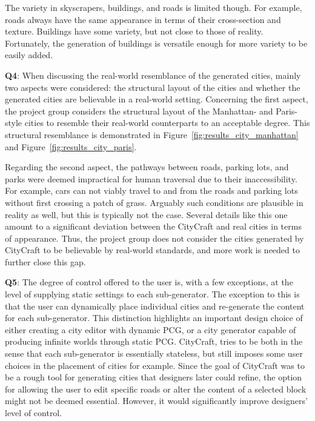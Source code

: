 The variety in skyscrapers, buildings, and roads is limited though.
For example, roads always have the same appearance in terms of their cross-section and texture.
Buildings have some variety, but not close to those of reality.
Fortunately, the generation of buildings is versatile enough for more variety to be easily added.

\textbf{Q4}:
When discussing the real-world resemblance of the generated cities, mainly two aspects were considered: the structural layout of the cities and whether the generated cities are believable in a real-world setting. 
Concerning the first aspect, the project group considers the structural layout of the Manhattan- and Paris-style cities to resemble their real-world counterparts to an acceptable degree.
This structural resemblance is demonstrated in Figure~\ref{fig:results_city_manhattan} and Figure~\ref{fig:results_city_paris}.

Regarding the second aspect, the pathways between roads, parking lots, and parks were deemed impractical for human traversal due to their inaccessibility.
For example, cars can not viably travel to and from the roads and parking lots without first crossing a patch of grass.
Arguably such conditions are plausible in reality as well, but this is typically not the case.
Several details like this one amount to a significant deviation between the CityCraft and real cities in terms of appearance.
Thus, the project group does not consider the cities generated by CityCraft to be believable by real-world standards, and more work is needed to further close this gap.

\textbf{Q5}:
The degree of control offered to the user is, with a few exceptions, at the level of supplying static settings to each sub-generator.
The exception to this is that the user can dynamically place individual cities and re-generate the content for each sub-generator.
This distinction highlights an important design choice of either creating a city editor with dynamic PCG, or a city generator capable of producing infinite worlds through static PCG.
CityCraft, tries to be both in the sense that each sub-generator is essentially stateless, but still imposes some user choices in the placement of cities for example.
Since the goal of CityCraft was to be a rough tool for generating cities that designers later could refine, the option for allowing the user to edit specific roads or alter the content of a selected block might not be deemed essential.
However, it would significantly improve designers' level of control.

